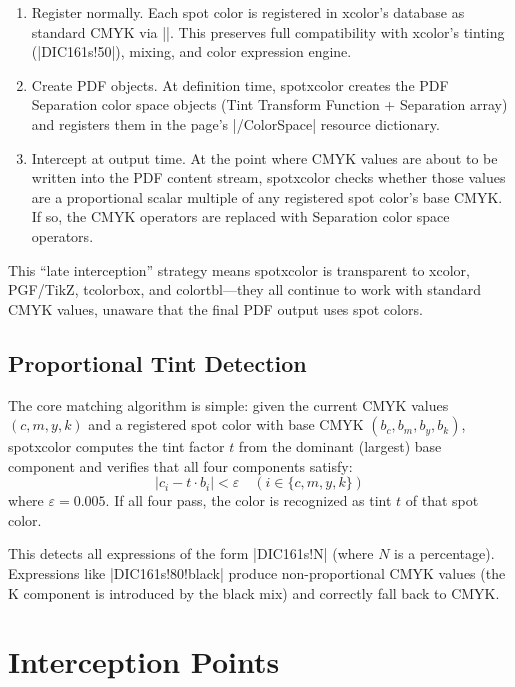 \documentclass[luatex]{article}
\newcommand\pkg[1]{\textsf{#1}}
\begin{document}
\begin{enumerate}
\item Register normally.
  Each spot color is registered in \pkg{xcolor}'s database as standard CMYK via |\definecolor|.
  This preserves full compatibility with \pkg{xcolor}'s tinting (|DIC161s!50|), mixing, and color expression engine.

\item Create PDF objects.
  At definition time, \pkg{spotxcolor} creates the PDF Separation color space objects (Tint Transform Function + Separation array) and registers them in the page's |/ColorSpace| resource dictionary.

\item Intercept at output time.
  At the point where CMYK values are about to be written into the PDF content stream, \pkg{spotxcolor} checks whether those values are a proportional scalar multiple of any registered spot color's base CMYK.
  If so, the CMYK operators are replaced with Separation color space operators.
\end{enumerate}

This ``late interception'' strategy means \pkg{spotxcolor} is transparent to \pkg{xcolor}, \pkg{PGF}/\pkg{TikZ}, \pkg{tcolorbox}, and \pkg{colortbl}---they all continue to work with standard CMYK values, unaware that the final PDF output uses spot colors.

\subsection{Proportional Tint Detection}

The core matching algorithm is simple:
given the current CMYK values $(c, m, y, k)$ and a registered spot color with base CMYK $(b_c, b_m, b_y, b_k)$,
\pkg{spotxcolor} computes the tint factor $t$ from the dominant (largest) base component and verifies that all four components satisfy:
\[
  \lvert c_i - t \cdot b_i \rvert < \varepsilon \quad (i \in \{c, m, y, k\})
\]
where $\varepsilon = 0.005$.
If all four pass, the color is recognized as tint $t$ of that spot color.

This detects all expressions of the form |DIC161s!N| (where $N$ is a percentage).
Expressions like |DIC161s!80!black| produce non-proportional CMYK values (the K component is introduced by the black mix) and correctly fall back to CMYK.

\section{Interception Points}
\end{document}
